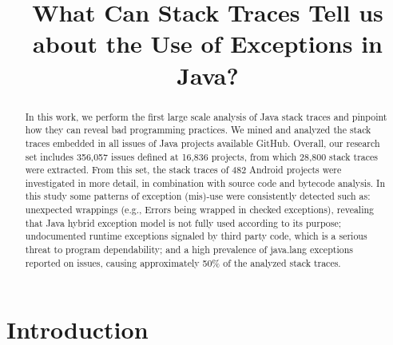 \documentclass[conference]{IEEEtran}
\begin{document}
\title{What Can Stack Traces Tell us about the Use of Exceptions in Java?}

\author{
}

\newcommand{\todo}[1]{\textbf{TODO}\footnote{\textbf{TODO:} #1}}

\maketitle

\begin{abstract}

In this work, we perform the first large scale analysis of Java stack traces and
pinpoint how they can reveal bad programming practices. We mined and analyzed
the stack traces embedded in all issues of Java projects available GitHub.
Overall, our research set includes 356,057 issues defined at 16,836 projects, 
from which 28,800 stack traces were extracted. From this set, the stack traces
of 482 Android projects were investigated in more detail, in combination with
source code and bytecode analysis. In this study some patterns of exception
(mis)-use were consistently detected such as: unexpected wrappings (e.g., Errors
being wrapped in checked exceptions), revealing that Java hybrid exception
model is not fully used according to its purpose;  undocumented runtime
exceptions signaled by third party code, which is a serious threat to program
dependability; and a high prevalence of java.lang exceptions reported on issues,  
causing approximately 50\% of the analyzed stack traces.


\end{abstract}


\section{Introduction}
\end{document}
